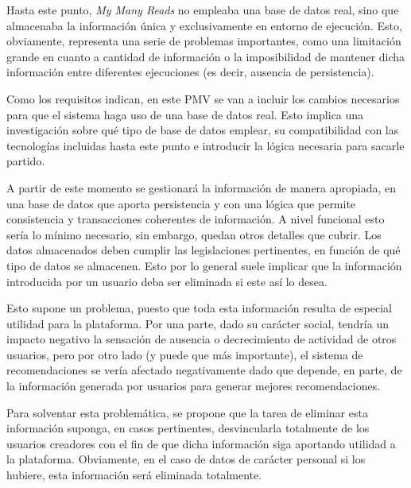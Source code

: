 Hasta este punto, \textit{My Many Reads} no empleaba una base de datos real, sino que almacenaba la información única y exclusivamente en entorno de ejecución. Esto, obviamente, representa una serie de problemas importantes, como una limitación grande en cuanto a cantidad de información o la imposibilidad de mantener dicha información entre diferentes ejecuciones (es decir, ausencia de persistencia).

Como los requisitos indican, en este PMV se van a incluir los cambios necesarios para que el sistema haga uso de una base de datos real. Esto implica una investigación sobre qué tipo de base de datos emplear, su compatibilidad con las tecnologías incluidas hasta este punto e introducir la lógica necesaria para sacarle partido.

A partir de este momento se gestionará la información de manera apropiada, en una base de datos que aporta persistencia y con una lógica que permite consistencia y transacciones coherentes de información. A nivel funcional esto sería lo mínimo necesario, sin embargo, quedan otros detalles que cubrir. Los datos almacenados deben cumplir las legislaciones pertinentes, en función de qué tipo de datos se almacenen. Esto por lo general suele implicar que la información introducida por un usuario deba ser eliminada si este así lo desea.

Esto supone un problema, puesto que toda esta información resulta de especial utilidad para la plataforma. Por una parte, dado su carácter social, tendría un impacto negativo la sensación de ausencia o decrecimiento de actividad de otros usuarios, pero por otro lado (y puede que más importante), el sistema de recomendaciones se vería afectado negativamente dado que depende, en parte, de la información generada por usuarios para generar mejores recomendaciones.

Para solventar esta problemática, se propone que la tarea de eliminar esta información suponga, en casos pertinentes, desvincularla totalmente de los usuarios creadores con el fin de que dicha información siga aportando utilidad a la plataforma. Obviamente, en el caso de datos de carácter personal si los hubiere, esta información será eliminada totalmente.